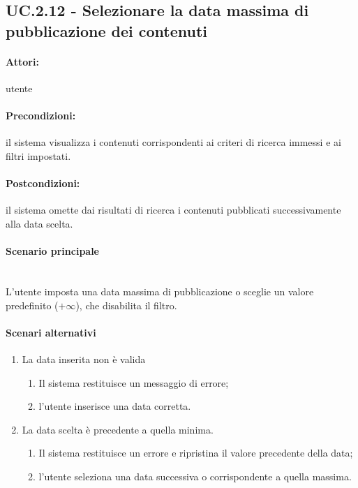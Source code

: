 \documentclass[10pt,a4paper,headinclude,footinclude,hidelinks]{scrreprt} %
\begin{document}
	\subsection[UC.2.12]{UC.2.12 - Selezionare la data massima di pubblicazione dei contenuti}
	\label{sec:stage:ar:uc:2_12}
	\paragraph{Attori:} utente
	\paragraph{Precondizioni:} il sistema visualizza i contenuti corrispondenti ai criteri di ricerca immessi e ai filtri impostati.
	\paragraph{Postcondizioni:} il sistema omette dai risultati di ricerca i contenuti pubblicati successivamente alla data scelta.
	\paragraph{Scenario principale} \hfill \\
	L'utente imposta una data massima di pubblicazione o sceglie un valore predefinito ($+\infty$), che disabilita il filtro.
	\paragraph{Scenari alternativi}
	\begin{enumerate}
	\item La data inserita non è valida
		\begin{enumerate}
		\item Il sistema restituisce un messaggio di errore;
		\item l'utente inserisce una data corretta.
		\end{enumerate}
	\item La data scelta è precedente a quella minima.
		\begin{enumerate}
		\item Il sistema restituisce un errore e ripristina il valore precedente della data;
		\item l'utente seleziona una data successiva o corrispondente a quella massima.
		\end{enumerate}
	\end{enumerate}
\end{document}
